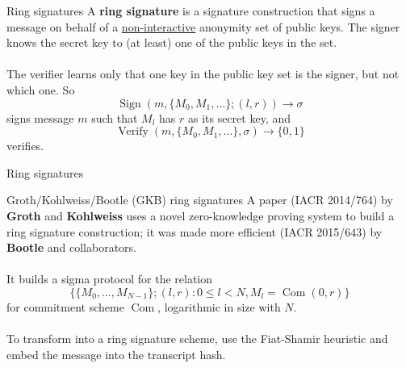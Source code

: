 \documentclass[aspectratio=169]{beamer}
\newcommand{\com}{\operatorname{Com}}
\begin{document}
\begin{frame}{Ring signatures}
A \textbf{ring signature} is a signature construction that signs a message on behalf of a \underline{non-interactive} anonymity set of public keys. The signer knows the secret key to (at least) one of the public keys in the set.
\\~\\
The verifier learns only that one key in the public key set is the signer, but not which one. So
$$\operatorname{Sign}(m,\{M_0,M_1,\ldots\};(l,r)) \to \sigma$$
signs message $m$ such that $M_l$ has $r$ as its secret key, and
$$\operatorname{Verify}(m,\{M_0,M_1,\ldots\},\sigma) \to \{0,1\}$$
verifies.
\end{frame}


\begin{frame}{Ring signatures}
\begin{center}
\end{center}
\end{frame}


\begin{frame}{Groth/Kohlweiss/Bootle (GKB) ring signatures}
A paper (IACR 2014/764) by \textbf{Groth} and \textbf{Kohlweiss} uses a novel zero-knowledge proving system to build a ring signature construction; it was made more efficient (IACR 2015/643) by \textbf{Bootle} and collaborators.
\\~\\
It builds a sigma protocol for the relation
$$\Big\{\{M_0,\ldots,M_{N-1}\};(l,r) : 0 \leq l < N, M_l = \com(0,r)\Big\}$$
for commitment scheme $\com$, logarithmic in size with $N$.
\\~\\
To transform into a ring signature scheme, use the Fiat-Shamir heuristic and embed the message into the transcript hash.
\end{frame}
\end{document}
